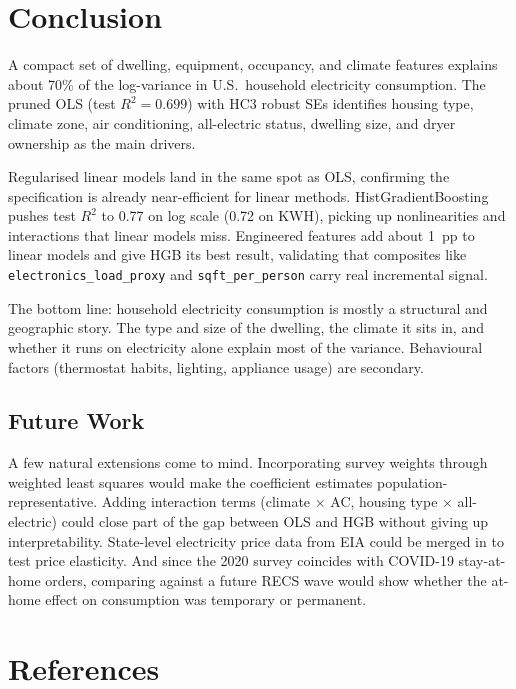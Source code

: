 \documentclass[10pt,twocolumn]{article}
\begin{document}
\section{Conclusion}

A compact set of dwelling, equipment, occupancy, and climate features explains about 70\% of the log-variance in U.S.\ household electricity consumption. The pruned OLS (test $R^2 = 0.699$) with HC3 robust SEs identifies housing type, climate zone, air conditioning, all-electric status, dwelling size, and dryer ownership as the main drivers.

Regularised linear models land in the same spot as OLS, confirming the specification is already near-efficient for linear methods. HistGradientBoosting pushes test $R^2$ to 0.77 on log scale (0.72 on KWH), picking up nonlinearities and interactions that linear models miss. Engineered features add about 1~pp to linear models and give HGB its best result, validating that composites like \texttt{electronics\_load\_proxy} and \texttt{sqft\_per\_person} carry real incremental signal.

The bottom line: household electricity consumption is mostly a structural and geographic story. The type and size of the dwelling, the climate it sits in, and whether it runs on electricity alone explain most of the variance. Behavioural factors (thermostat habits, lighting, appliance usage) are secondary.

\subsection*{Future Work}

A few natural extensions come to mind. Incorporating survey weights through weighted least squares would make the coefficient estimates population-representative. Adding interaction terms (climate $\times$ AC, housing type $\times$ all-electric) could close part of the gap between OLS and HGB without giving up interpretability. State-level electricity price data from EIA could be merged in to test price elasticity. And since the 2020 survey coincides with COVID-19 stay-at-home orders, comparing against a future RECS wave would show whether the at-home effect on consumption was temporary or permanent.

\balance %
\section*{References}
\end{document}
